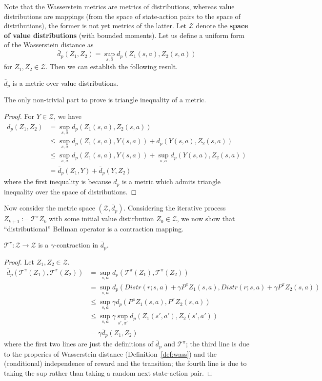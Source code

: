 \documentclass{article}
\begin{document}
Note that the Wasserstein metrics are metrics of distributions, whereas value distributions are mappings (from the space of state-action pairs to the space of distributions), the former is not yet metrics of the latter.
Let $\mathcal{Z}$ denote the \textbf{space of value distributions} (with bounded moments).
Let us define a uniform form of the Wasserstein distance as 
$$\bar{d}_p(Z_1,Z_2) = \sup_{s,a} d_p(Z_1(s,a), Z_2(s,a))$$
for $Z_1,Z_2\in\mathcal{Z}$.
Then we can establish the following result.
\begin{lem}
$\bar{d}_p$ is a metric over value distributions.
\end{lem}
The only non-trivial part to prove is triangle inequality of a metric.
\begin{proof}
For $Y\in\mathcal{Z}$, we have 
\begin{align*}
\bar{d}_p(Z_1,Z_2) &= \sup_{s,a} d_p(Z_1(s,a), Z_2(s,a)) \\
&\leq \sup_{s,a} d_p(Z_1(s,a), Y(s,a))+ d_p(Y(s,a), Z_2(s,a)) \\
&\leq \sup_{s,a} d_p(Z_1(s,a), Y(s,a))+ \sup_{s,a} d_p(Y(s,a), Z_2(s,a)) \\
&= \bar{d}_p(Z_1,Y)+\bar{d}_p(Y,Z_2)
\end{align*}
where the first inequality is because $d_p$ is a metric which admits triangle inequality over the space of distributions.
\end{proof}


Now consider the metric space $(\mathcal{Z}, \bar{d}_p)$. 
Considering the iterative process $Z_{k+1}:=\mathcal{T}^\pi Z_k$ with some initial value distirbution $Z_0\in\mathcal{Z}$, we now show that ``distributional'' Bellman operator is a contraction mapping. 
\begin{lem}
$\mathcal{T}^\pi:\mathcal{Z}\rightarrow\mathcal{Z}$ is a $\gamma$-contraction in $\bar{d}_p$.
\end{lem}
\begin{proof}
Let $Z_1,Z_2\in\mathcal{Z}$. 
\begin{align*}
\bar{d}_p(\mathcal{T}^\pi(Z_1),\mathcal{T}^\pi(Z_2)) &= \sup_{s,a} d_p(\mathcal{T}^\pi(Z_1),\mathcal{T}^\pi(Z_2)) \\
&= \sup_{s,a} d_p(Distr(r; s,a) + \gamma P^\pi Z_1(s,a),Distr(r; s,a) + \gamma P^\pi Z_2(s,a)) \\
&\leq \sup_{s,a} \gamma d_p( P^\pi Z_1(s,a),P^\pi Z_2(s,a)) \\
&\leq \sup_{s,a} \gamma \sup_{s',a'} d_p(  Z_1(s',a'), Z_2(s',a')) \\
&= \gamma \bar{d}_p(Z_1, Z_2) 
\end{align*}
where the first two lines are just the definitions of $\bar{d}_p$ and $\mathcal{T}^\pi$; 
the third line is due to the properies of Wasserstein distance (Definition~\ref{def:wass}) and the (conditional) independence of reward and the transition; 
the fourth line is due to taking the sup rather than taking a random next state-action pair. 
\end{proof}
\end{document}
